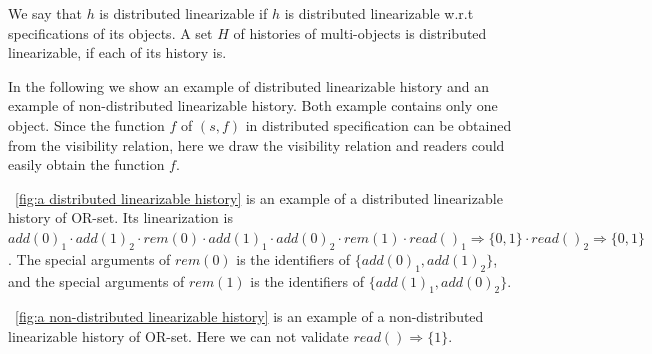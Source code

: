 {\begin{definition}
We say that $h$ is distributed linearizable if $h$ is distributed linearizable w.r.t specifications of its objects. A set $H$ of histories of multi-objects is distributed linearizable, if each of its history is.
\end{definition}



In the following we show an example of distributed linearizable history and an example of non-distributed linearizable history. Both example contains only one object. Since the function $f$ of $(s,f)$ in distributed specification can be obtained from the visibility relation, here we draw the visibility relation and readers could easily obtain the function $f$.

\figurename~\ref{fig:a distributed linearizable history} is an example of a distributed linearizable history of OR-set. Its linearization is $\mathit{add}(0)_1 \cdot \mathit{add}(1)_2 \cdot \mathit{rem}(0) \cdot \mathit{add}(1)_1 \cdot \mathit{add}(0)_2 \cdot \mathit{rem}(1) \cdot \mathit{read}()_1 \Rightarrow \{0,1\} \cdot \mathit{read}()_2 \Rightarrow \{0,1\}$. The special arguments of $\mathit{rem}(0)$ is the identifiers of $\{ \mathit{add}(0)_1, \mathit{add}(1)_2 \}$, and the special arguments of $\mathit{rem}(1)$ is the identifiers of $\{ \mathit{add}(1)_1, \mathit{add}(0)_2 \}$.

\figurename~\ref{fig:a non-distributed linearizable history} is an example of a non-distributed linearizable history of OR-set. Here we can not validate $\mathit{read}() \Rightarrow \{ 1 \}$.

}

